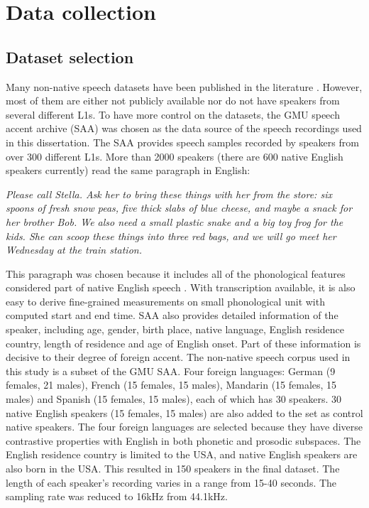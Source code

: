 \section{Data collection}

\label{sec:data_collection}

\subsection{Dataset selection}

Many non-native speech datasets have been published in the literature \citep{raab2007non}. However, most of them are either not publicly available nor do not have speakers from several different L1s. To have more control on the datasets, the GMU speech accent archive (SAA) \citep{weinberger2013speech} was chosen as the data source of the speech recordings used in this dissertation. The SAA provides speech samples recorded by speakers from over 300 different L1s. More than 2000 speakers (there are 600 native English speakers currently) read the same paragraph in English:

\vspace{4pt}
\textit{Please call Stella.  Ask her to bring these things with her from the store: six spoons of fresh snow peas, five thick slabs of blue cheese, and maybe a snack for her brother Bob. We also need a small plastic snake and a big toy frog for the kids. She can scoop these things into three red bags, and we will go meet her Wednesday at the train station.}
\vspace{4pt}

This paragraph was chosen because it includes all of the phonological features considered part of native English speech \citep{kunath2010wisdom}. With transcription available, it is also easy to derive fine-grained measurements on small phonological unit with computed start and end time. SAA also provides detailed information of the speaker, including age, gender, birth place, native language, English residence country, length of residence and age of English onset. Part of these information is decisive to their degree of foreign accent. The non-native speech corpus used in this study is a subset of the GMU SAA. Four foreign languages: German (9 females, 21 males), French (15 females, 15 males), Mandarin (15 females, 15 males) and Spanish (15 females, 15 males), each of which has 30 speakers. 30 native English speakers (15 females, 15 males) are also added to the set as control native speakers. The four foreign languages are selected because they have diverse contrastive properties with English in both phonetic and prosodic subspaces. The English residence country is limited to the USA, and native English speakers are also born in the USA. This resulted in 150 speakers in the final dataset. The length of each speaker's recording varies in a range from 15-40 seconds. The sampling rate was reduced to 16kHz from 44.1kHz.



